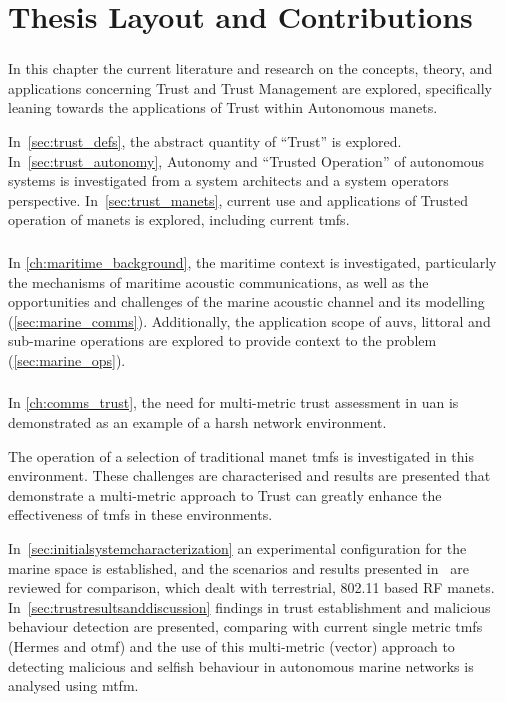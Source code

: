 \section{Thesis Layout and Contributions}

\subsubsection{}
In this chapter the current literature and research on the concepts, theory, and applications concerning Trust and Trust Management are explored, specifically leaning towards the applications of Trust within Autonomous \glspl{manet}.

In~\autoref{sec:trust_defs}, the abstract quantity of ``Trust'' is explored.
In~\autoref{sec:trust_autonomy}, Autonomy and ``Trusted Operation'' of autonomous systems is investigated from a system architects and a system operators perspective.
In~\autoref{sec:trust_manets}, current use and applications of Trusted operation of \glspl{manet} is explored, including current \glspl{tmf}.

\subsubsection{}
In \autoref{ch:maritime_background}, the maritime context is investigated, particularly the mechanisms of maritime acoustic communications, as well as the opportunities and challenges of the marine acoustic channel and its modelling (\autoref{sec:marine_comms}).
Additionally, the application scope of \glspl{auv}, littoral and sub-marine operations are explored to provide context to the problem (\autoref{sec:marine_ops}).

\subsubsection{}
In \autoref{ch:comms_trust}, the need for multi-metric trust assessment in \gls{uan} is demonstrated as an example of a harsh network environment.

The operation of a selection of traditional \gls{manet} \glspl{tmf} is investigated in this environment.
These challenges are characterised and results are presented that demonstrate a multi-metric approach to Trust can greatly enhance the effectiveness of \glspl{tmf} in these environments.

In~\autoref{sec:initialsystemcharacterization} an experimental configuration for the marine space is established, and the scenarios and results presented in~\citet{Guo11} are reviewed for comparison, which dealt with terrestrial, 802.11 based RF \glspl{manet}.
In~\autoref{sec:trustresultsanddiscussion} findings in trust establishment and malicious behaviour detection are presented, comparing with current single metric \glspl{tmf} (Hermes and \gls{otmf}) and the use of this multi-metric (vector) approach to detecting malicious and selfish behaviour in autonomous marine networks is analysed using \gls{mtfm}.

